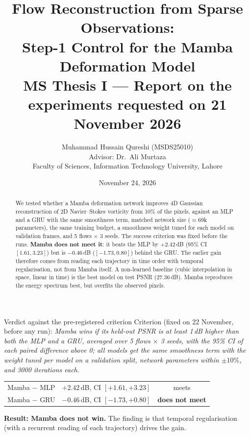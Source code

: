 \documentclass[11pt,a4paper]{article}
\title{\textbf{Flow Reconstruction from Sparse Observations:\\ Step-1 Control for the Mamba Deformation Model}\\[4pt]
\large MS Thesis I --- Report on the experiments requested on 21 November 2026}
\author{Muhammad Hussain Qureshi (MSDS25010)\\
Advisor: Dr.\ Ali Murtaza\\
Faculty of Sciences, Information Technology University, Lahore}
\date{November 24, 2026}
\begin{document}
\maketitle

\begin{abstract}
\noindent We tested whether a Mamba deformation network improves 4D Gaussian reconstruction of 2D Navier--Stokes
vorticity from 10\% of the pixels, against an MLP and a GRU with the same smoothness term, matched network size
($\approx$69k parameters), the same training budget, a smoothness weight tuned for each model on validation frames,
and 5 flows $\times$ 3 seeds. The success criterion was fixed before the runs. \textbf{Mamba does not meet it}: it
beats the MLP by $+2.42$\,dB (95\% CI $[1.61, 3.23]$) but is $-0.46$\,dB ($[-1.73, 0.80]$) behind the GRU. The
earlier gain therefore comes from reading each trajectory in time order with temporal regularisation, not from
Mamba itself. A non-learned baseline (cubic interpolation in space, linear in time) is the best model on test PSNR
(27.36\,dB). Mamba reproduces the energy spectrum best, but overfits the observed pixels.
\end{abstract}

\begin{keybox}{Verdict against the pre-registered criterion}
Criterion (fixed on 22 November, before any run): \emph{Mamba wins if its held-out PSNR is at least 1\,dB higher
than both the MLP and a GRU, averaged over 5 flows $\times$ 3 seeds, with the 95\% CI of each paired difference above
0; all models get the same smoothness term with the weight tuned per model on a validation split, network parameters
within $\pm10\%$, and 3000 iterations each.}

\smallskip
\begin{tabular}{lcc}
Mamba $-$ MLP & $+2.42$\,dB, CI $[+1.61, +3.23]$ & meets \\
Mamba $-$ GRU & $-0.46$\,dB, CI $[-1.73, +0.80]$ & \textbf{does not meet} \\
\end{tabular}

\smallskip
\textbf{Result: Mamba does not win.} The finding is that temporal regularisation (with a recurrent reading of each
trajectory) drives the gain.
\end{keybox}
\end{document}

